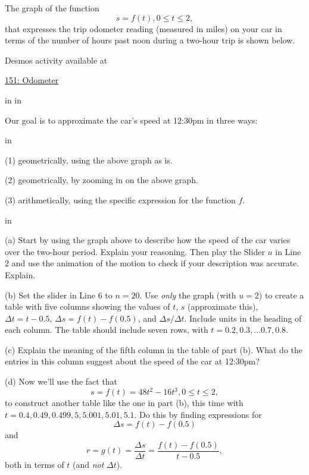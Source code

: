 \documentclass{ximera}
\newcommand{\pskip}{\vskip 0.1 in}
\begin{document}
\begin{example} \label{Ex:lkdftr45}
The graph of the function
\[
    s = f(t) , 0\leq t \leq 2 ,
\]
that expresses the trip odometer reading (measured in miles) on your car in terms of the number of hours past noon during a two-hour trip is shown below.

 
\begin{onlineOnly}
    \begin{center}
\end{center}
\end{onlineOnly}

Desmos activity available at

\href{https://www.desmos.com/calculator/tumgpu4n0w}{151: Odometer}

\pskip \pskip

Our goal is to approximate the car's speed at 12:30pm in three ways:

\pskip

(1) geometrically, using the above graph as is.

(2) geometrically, by zooming in on the above graph.

(3) arithmetically, using the specific expression for the function $f$.


\pskip

(a) Start by using the graph above to describe how the speed of the car varies over the two-hour period. Explain your reasoning. Then play the Slider $u$ in Line 2 and use the animation of the motion to check if your description was accurate. Explain.

(b) Set the slider in Line 6 to $n=20$. Use \emph{only} the graph (with $u=2$) to create a table with five columns showing the values of $t$, $s$ (approximate this), $\Delta t = t-0.5$, $\Delta s=f(t)-f(0.5)$, and $\Delta s / \Delta t$. Include units in the heading of each column. The table should include seven rows, with $t=0.2, 0.3, \ldots 0.7, 0.8$. 

(c) Explain the meaning of the fifth column in the table of part (b). What do the entries in this column suggest about the speed of the car at 12:30pm?

(d) Now we'll use the fact that
\[
   s = f(t) = 48t^2 - 16t^3, 0 \leq t \leq 2 ,
\]
to construct another table like the one in part (b), this time with $t=0.4, 0.49, 0.499, 5, 5.001, 5.01, 5.1$. Do this by finding expressions for 
\[
    \Delta s = f(t) - f(0.5)
\]
and
\[
   r = g(t) = \frac{\Delta s}{\Delta t} = \frac{f(t) - f(0.5)}{t-0.5} ,
\]
both in terms of $t$ (and \emph{not} $\Delta t$).



\end{example}
\end{document}
